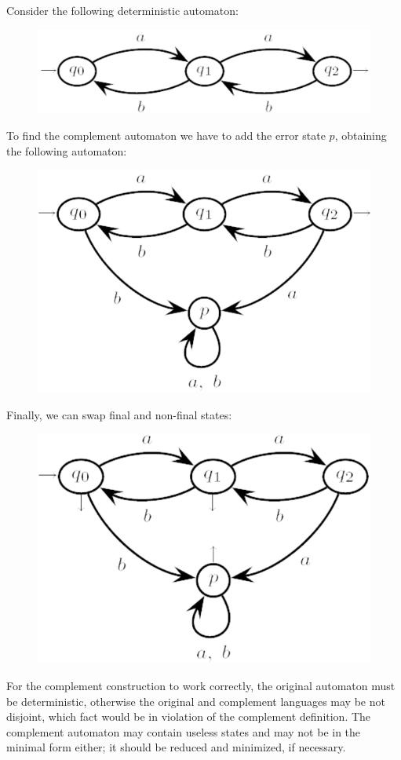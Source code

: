 \begin{example}
    Consider the following deterministic automaton: 
    \begin{figure}[H]
        \centering
        \includegraphics[width=0.5\linewidth]{images/compl.png}
    \end{figure}
    To find the complement automaton we have to add the error state $p$, obtaining the following automaton: 
    \begin{figure}[H]
        \centering
        \includegraphics[width=0.35\linewidth]{images/compl1.png}
    \end{figure}
    Finally, we can swap final and non-final states: 
    \begin{figure}[H]
        \centering
        \includegraphics[width=0.35\linewidth]{images/compl2.png}
    \end{figure}
\end{example}
For the complement construction to work correctly, the original automaton must be deterministic, otherwise the original and complement languages may be not disjoint, which fact would be in violation of the complement definition. 
The complement automaton may contain useless states and may not be in the minimal form either; it should be reduced and minimized, if necessary. 

